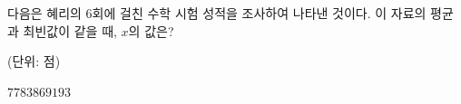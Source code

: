 다음은 혜리의 $6$회에 걸친 수학 시험 성적을 조사하여 나타낸 것이다. 이 자료의 평균과 최빈값이 같을 때, $x$의 값은?\par\noindent\hfill{\footnotesize (단위: 점)}
\begin{choices32}{$77$}{$83$}{$86$}{$91$}{$93$}\end{choices32}

